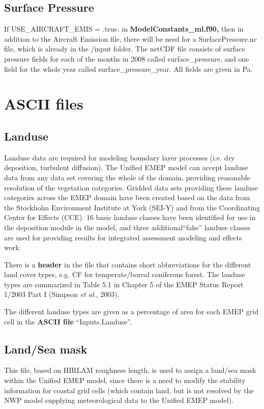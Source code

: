\subsection{Surface Pressure}

If USE\_AIRCRAFT\_EMIS = .true. in { \bf ModelConstants\_ml.f90,} then in addition to the Aircraft 
Emission file, there will be need for a SurfacePressure.nc file, which is already in the /input folder. 
The netCDF file consists of surface pressure fields for each of the months in 2008 called surface\_pressure, 
and one field for the whole year called surface\_pressure\_year. All fields are given in Pa. 

\section{ASCII files}

\subsection{Landuse}

Landuse data are required for modeling boundary layer processes
(i.e. dry deposition, turbulent diffusion).
The Unified EMEP model can accept landuse data from any
data set covering the whole of the domain, providing reasonable 
resolution of the vegetation categories. Gridded data sets providing
these landuse categories across the EMEP domain have been created
based on the data from the Stockholm Environment Institute at York 
(SEI-Y) and from the Coordinating Center for Effects (CCE). 
16 basic landuse classes have been identified for use in the
deposition module in the model, and three additional``fake'' landuse
classes are used for providing results for integrated assessment
modeling and effects work.

There is a {\bf header} in the file that contains short abbreviations 
for the different land cover
types, e.g. CF for temperate/boreal coniferous forest. The landuse
types are summarized in Table 5.1 in Chapter 5 of the EMEP Status
Report 1/2003 Part I (Simpson {\sl et al.}, 2003).

The different landuse types are given as a percentage of area for each 
EMEP grid cell in the {\bf ASCII file} ``Inputs.Landuse''. 



\subsection{Land/Sea mask}
This file, based on HIRLAM roughness length, is used
to assign a land/sea mask within the Unified EMEP model, since there is
a need to modify the stability information for coastal grid cells
(which contain land, but is not resolved by the NWP model supplying 
meteorological data to the Unified EMEP model). 

